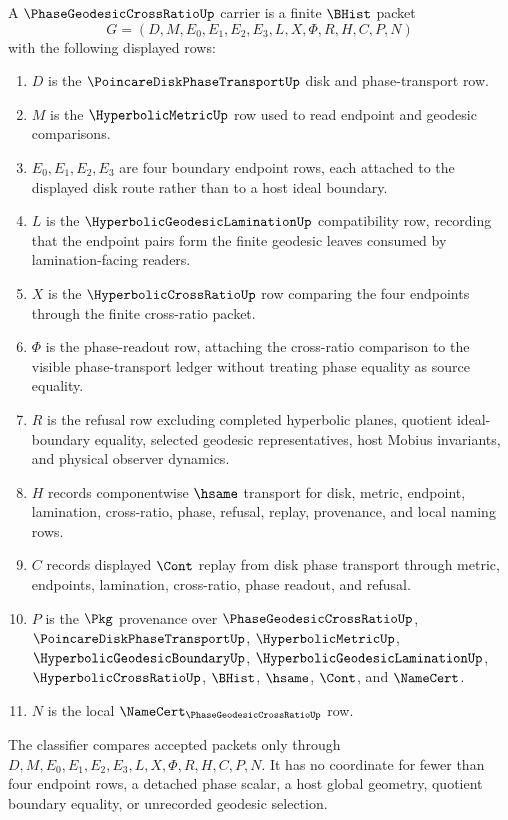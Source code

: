 \begin{definition}
\label{def:phase-geodesic-cross-ratio-carrier}
A $\PhaseGeodesicCrossRatioUp$ carrier is a finite $\BHist$ packet
$$
G=(D,M,E_0,E_1,E_2,E_3,L,X,\Phi,R,H,C,P,N)
$$
with the following displayed rows:
\begin{enumerate}
\item $D$ is the $\PoincareDiskPhaseTransportUp$ disk and phase-transport row.
\item $M$ is the $\HyperbolicMetricUp$ row used to read endpoint and geodesic comparisons.
\item $E_0,E_1,E_2,E_3$ are four boundary endpoint rows, each attached to the displayed disk route rather than to a host ideal boundary.
\item $L$ is the $\HyperbolicGeodesicLaminationUp$ compatibility row, recording that the endpoint pairs form the finite geodesic leaves consumed by lamination-facing readers.
\item $X$ is the $\HyperbolicCrossRatioUp$ row comparing the four endpoints through the finite cross-ratio packet.
\item $\Phi$ is the phase-readout row, attaching the cross-ratio comparison to the visible phase-transport ledger without treating phase equality as source equality.
\item $R$ is the refusal row excluding completed hyperbolic planes, quotient ideal-boundary equality, selected geodesic representatives, host Mobius invariants, and physical observer dynamics.
\item $H$ records componentwise $\hsame$ transport for disk, metric, endpoint, lamination, cross-ratio, phase, refusal, replay, provenance, and local naming rows.
\item $C$ records displayed $\Cont$ replay from disk phase transport through metric, endpoints, lamination, cross-ratio, phase readout, and refusal.
\item $P$ is the $\Pkg$ provenance over $\PhaseGeodesicCrossRatioUp$, $\PoincareDiskPhaseTransportUp$, $\HyperbolicMetricUp$, $\HyperbolicGeodesicBoundaryUp$, $\HyperbolicGeodesicLaminationUp$, $\HyperbolicCrossRatioUp$, $\BHist$, $\hsame$, $\Cont$, and $\NameCert$.
\item $N$ is the local $\NameCert_{\PhaseGeodesicCrossRatioUp}$ row.
\end{enumerate}
The classifier compares accepted packets only through $D,M,E_0,E_1,E_2,E_3,L,X,\Phi,R,H,C,P,N$. It has no coordinate for fewer than four endpoint rows, a detached phase scalar, a host global geometry, quotient boundary equality, or unrecorded geodesic selection.
\end{definition}

